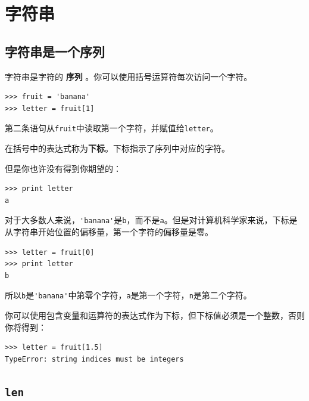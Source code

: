 \chapter{字符串}
\label{字符串}


\section{字符串是一个序列}

字符串是字符的 {\bf 序列} 。你可以使用括号运算符每次访问一个字符。 

\beforeverb
\begin{verbatim}
>>> fruit = 'banana'
>>> letter = fruit[1]
\end{verbatim}
\afterverb
%
第二条语句从{\tt fruit}中读取第一个字符，并赋值给{\tt letter}。


在括号中的表达式称为{\bf 下标}。下标指示了序列中对应的字符。

但是你也许没有得到你期望的：

\beforeverb
\begin{verbatim}
>>> print letter
a
\end{verbatim}
\afterverb
%
对于大多数人来说，\verb"'banana'"是{\tt b}，而不是{\tt a}。但是对计算机科学家来说，下标是从字符串开始位置的偏移量，第一个字符的偏移量是零。

\beforeverb
\begin{verbatim}
>>> letter = fruit[0]
>>> print letter
b
\end{verbatim}
\afterverb
%
所以{\tt b}是\verb"'banana'"中第零个字符，{\tt a}是第一个字符，{\tt n}是第二个字符。


你可以使用包含变量和运算符的表达式作为下标，但下标值必须是一个整数，否则你将得到：


\beforeverb
\begin{verbatim}
>>> letter = fruit[1.5]
TypeError: string indices must be integers
\end{verbatim}
\afterverb
%

\section{{\tt len}}


